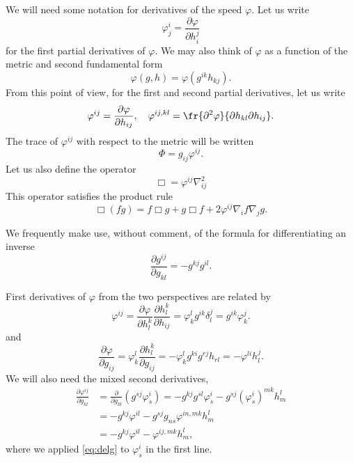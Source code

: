 \documentclass[12pt]{amsart}
\begin{document}
We will need some notation for derivatives of the speed \(\varphi\). Let us write
\[
\varphi^{i}_{j} = \frac{\partial \varphi}{\partial h^{j}_{i}}
\]
for the first partial derivatives of \(\varphi\). We may also think of \(\varphi\) as a function of the metric and second fundamental form
\[
\varphi(g, h) = \varphi(g^{ik} h_{kj}).
\]
From this point of view, for the first and second partial derivatives, let us write
\[
\varphi^{ij} = \frac{\partial\varphi}{\partial h_{ij}}, \quad \varphi^{ij,kl} = \fr{\partial^2\varphi}{\partial h_{kl} \partial h_{ij}}.
\]
The trace of \(\varphi^{ij}\) with respect to the metric will be written
\[
\Phi = g_{ij} \varphi^{ij}.
\]
Let us also define the operator
\[
\Box = \varphi^{ij} \nabla^2_{ij}
\]
This operator satisfies the product rule
\begin{equation}
\label{eq:productbox}
\Box (fg) = f \Box g + g \Box f + 2 \varphi^{ij} \nabla_i f \nabla_j g.
\end{equation}

We frequently make use, without comment, of the formula for differentiating an inverse
\[
\frac{\partial g^{ij}}{\partial g_{kl}} = - g^{kj} g^{il}.
\]

First derivatives of \(\varphi\) from the two perspectives are related by
\begin{equation}
\label{eq:delh}
\varphi^{ij} = \frac{\partial \varphi}{\partial h_l^k} \frac{\partial h_l^k}{\partial h_{ij}} = \varphi^l_k g^{ik} \delta^j_l = g^{ik} \varphi^j_k.
\end{equation}
and
\begin{equation}
\label{eq:delg}
\frac{\partial\varphi}{\partial g_{ij}} = \varphi^{l}_{k} \frac{\partial h^{k}_{l}}{\partial g_{ij}} = -\varphi^{l}_{k} g^{ki} g^{rj} h_{rl} = -\varphi^{li}h^{j}_{l}.
\end{equation}
We will also need the mixed second derivatives,
\begin{equation}
\label{eq:delhdelg}
\begin{split}
\frac{\partial \varphi^{ij}}{\partial g_{kl}} &= \frac{\partial}{\partial g_{kl}} \left(g^{sj} \varphi^{i}_{s} \right) = - g^{kj}g^{sl} \varphi^{i}_{s} - g^{sj} (\varphi^i_s)^{mk} h^l_m \\
&= - g^{kj} \varphi^{il} - g^{sj} g_{ns} \varphi^{in,mk} h^l_m \\
&= - g^{kj} \varphi^{il} - \varphi^{ij,mk} h^l_m,
\end{split}
\end{equation}
where we applied \cref{eq:delg} to \(\varphi^i_s\) in the first line.
\end{document}
